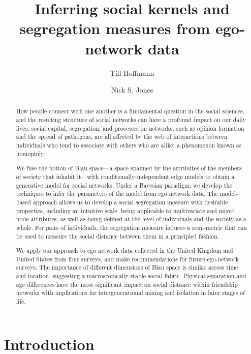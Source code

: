 \documentclass{scrartcl}
\title{Inferring social kernels and segregation measures from ego-network data}
\author{Till Hoffmann}
\author{Nick S. Jones}
\affil{Department of Mathematics, Imperial College London}
\date{}
\begin{document}
\maketitle

\begin{abstract} %
  How people connect with one another is a fundamental question in the social sciences, and the resulting structure of social networks can have a profound impact on our daily lives: social capital, segregation, and processes on networks, such as opinion formation and the spread of pathogens, are all affected by the web of interactions between individuals who tend to associate with others who are alike: a phenomenon known as homophily.

  We fuse the notion of Blau space---a space spanned by the attributes of the members of society that inhabit it---with conditionally-independent edge models to obtain a generative model for social networks. Under a Bayesian paradigm, we develop the techniques to infer the parameters of the model from ego network data. The model-based approach allows us to develop a social segregation measure with desirable properties, including an intuitive scale, being applicable to multivariate and mixed node attributes, as well as being defined at the level of individuals and the society as a whole. For pairs of individuals, the segregation measure induces a semi-metric that can be used to measure the social distance between them in a principled fashion.

  We apply our approach to ego network data collected in the United Kingdom and United States from four surveys, and make recommendations for future ego-network surveys. The  importance of different dimensions of Blau space is similar across time and location, suggesting a macroscopically stable social fabric. Physical separation and age differences have the most significant impact on social distance within friendship networks with implications for intergenerational mixing and isolation in later stages of life.
\end{abstract}

\section{Introduction}
\end{document}

